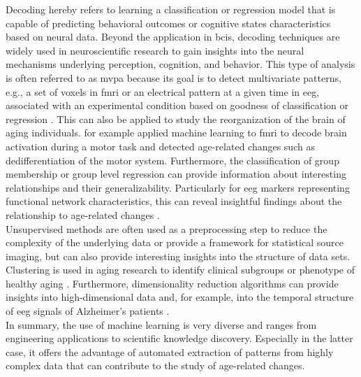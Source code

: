 Decoding hereby refers to learning a classification or regression model that is capable of predicting behavioral outcomes or cognitive states characteristics based on neural data. Beyond the application in \glspl{bci}, decoding techniques are widely used in neuroscientific research to gain insights into the neural mechanisms underlying perception, cognition, and behavior. This type of analysis is often referred to as \gls{mvpa} because its goal is to detect multivariate patterns, e.g., a set of voxels in \gls{fmri} or an electrical pattern at a given time in \gls{eeg}, associated with an experimental condition based on goodness of classification or regression \cite{Holdgraf2017}. This can also be applied to study the reorganization of the brain of aging individuals. \cite{Carb2011} for example applied machine learning to \gls{fmri} to decode brain activation during a motor task and detected age-related changes such as dedifferentiation of the motor system. Furthermore, the classification of group membership or group level regression can provide information about interesting relationships and their generalizability. Particularly for \gls{eeg} markers representing functional network characteristics, this can reveal insightful findings about the relationship to age-related changes \cite{Petti2016}.\\
Unsupervised methods are often used as a preprocessing step to reduce the complexity of the underlying data or provide a framework for statistical source imaging, but can also provide interesting insights into the structure of data sets. Clustering is used in aging research to identify clinical subgroups or phenotype of healthy aging \cite{Marron2019}. Furthermore, dimensionality reduction algorithms can provide insights into high-dimensional data and, for example, into the temporal structure of \gls{eeg} signals of Alzheimer's patients \cite{Smailovic2019}.\\
In summary, the use of machine learning is very diverse and ranges from engineering applications to scientific knowledge discovery. Especially in the latter case, it offers the advantage of automated extraction of patterns from highly complex data that can contribute to the study of age-related changes. 


